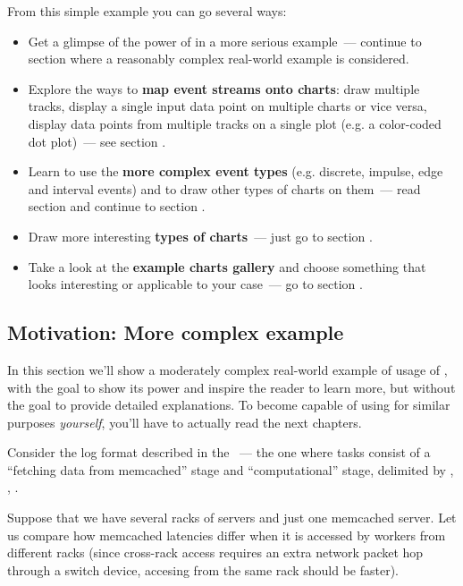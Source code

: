 \documentclass{article}
\begin{document}
From this simple example you can go several ways:
\begin{itemize}
\item Get a glimpse of the power of \timeplot{} in a more serious example~--- continue to section  where a reasonably complex real-world example is considered.
\item Explore the ways to \textbf{map event streams onto charts}: draw multiple tracks, display a single input data point on multiple charts or vice versa, display data points from multiple tracks on a single plot (e.g. a color-coded dot plot)~--- see section .
\item Learn to use the \textbf{more complex event types} (e.g. discrete, impulse, edge and interval events) and to draw other types of charts on them~--- read section  and continue to section .
\item Draw more interesting \textbf{types of charts}~--- just go to section .
\item Take a look at the \textbf{example charts gallery} and choose something that looks interesting or applicable to your case~--- go to section .
\end{itemize}

\subsection{Motivation: More complex example}
\label{sec:tplot-motivation}
In this section we'll show a moderately complex real-world example of usage of \timeplot{}, with the goal to show its power and inspire the reader to learn more, but without the goal to provide detailed explanations. To become capable of using \timeplot{} for similar purposes \emph{yourself}, you'll have to actually read the next chapters.

Consider the log format described in the ~--- the one where tasks consist of a ``fetching data from memcached'' stage and ``computational'' stage, delimited by , , .

Suppose that we have several racks of servers and just one memcached server. Let us compare how memcached latencies differ when it is accessed by workers from different racks (since cross-rack access requires an extra network packet hop through a switch device, accesing from the same rack should be faster).
\end{document}
